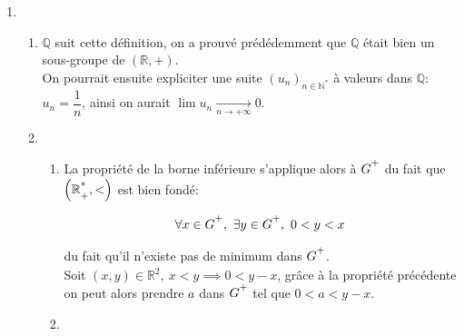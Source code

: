 \documentclass[article,11pt]{article}
\newcommand{\eqencld}[1]{
    \begin{equation*}#1\end{equation*}
}
\newcommand{\bgp}[1]{
    \left(#1\right)
}
\newcommand{\bgbr}[1]{
    \left\{#1\right\}
}
\begin{document}
\begin{enumerate}
\begin{enumerate}
\begin{center}\end{center}
Puis avec $\varepsilon=v-u$ on obtient $v=u+\varepsilon$, donc $\varepsilon\in G$.\\[.3em]
On sait donc: $\varepsilon\in G$ et $\varepsilon\in\mathopen]0,d\mathclose[$, ce qui est absurde.\\[.3em]
Puisque l'hypothèse initiale est absurde, on en déduit que $d\in G$.
\item On a obtenu $d=\inf(G\strut^{+})$, donc $d^{-1}=-d=\sup\bgp{G\cap\mathbb{R}\strut^{*}_{-}}$.\\[.3em]
Du fait de la loi $+$ on a $\forall n\in G,\ \exists k\in\mathbb{Z},\ n=dk$.
Donc $G=\bgbr{dk,\ k\in\mathbb{Z}}=d\mathbb{Z}$.
\end{enumerate}
\item\begin{enumerate}
\item$\mathbb{Q}$ suit cette définition, on a prouvé prédédemment que $\mathbb{Q}$ était bien un sous-groupe de $\bgp{\mathbb{R},+}$.\\[.3em]
On pourrait ensuite expliciter une suite $\bgp{u_{n}}_{n\in\mathbb{N}^{*}}$ à valeurs dans $\mathbb{Q}$:\\$u_{n}=\dfrac{1}{n}$, ainsi on aurait $\lim u_{n}\xrightarrow[n\rightarrow+\infty]{} 0$.
\item\begin{enumerate}[label=-]
\item La propriété de la borne inférieure s'applique alors à $G\strut^{+}$ du fait que $\bgp{\mathbb{R}\strut^{*}_{+},<}$ est bien fondé:
\eqencld{\forall x\in G\strut^{+},\ \exists y\in G\strut^{+},\ 0<y<x}
du fait qu'il n'existe pas de minimum dans $G\strut^{+}$.\\[.3em]
Soit $(x,y)\in\mathbb{R}^{2},\ x<y\implies 0<y-x$, grâce à la propriété précédente on peut alors prendre $a$ dans $G\strut^{+}$ tel que $0<a<y-x$.
\item
\end{enumerate}
\end{enumerate}
\end{enumerate}
\end{document}
